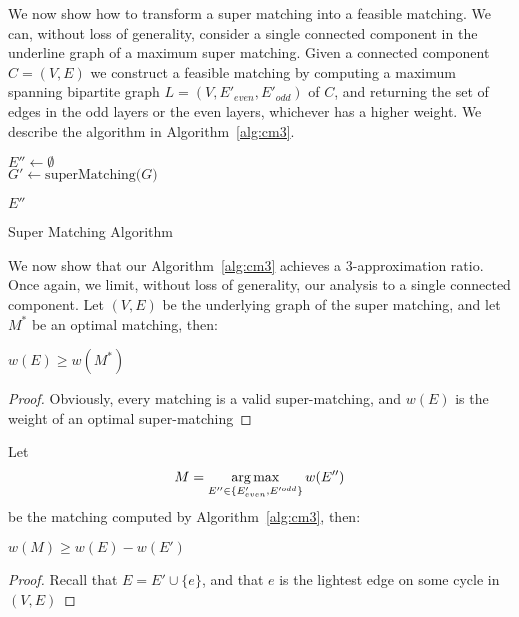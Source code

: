 We now show how to transform a super matching into a feasible matching.
We can, without loss of generality, 
consider a single connected component in the underline graph of a maximum super matching.
Given a connected component $C = (V, E)$ we construct a feasible matching by
computing a maximum spanning bipartite graph $L = (V, E'_{even}, E'_{odd})$ of $C$,
and returning the set of edges in the odd layers or the even layers,
whichever has a higher weight. 
We describe the algorithm in Algorithm~\ref{alg:cm3}.

\begin{algorithm}
\label{alg:cm3}

$E'' \leftarrow \emptyset$								\\
$G' \leftarrow \text{superMatching($G$)}$				\\


\Return $E''$
\caption{Super Matching Algorithm}
\end{algorithm}

We now show that our Algorithm~\ref{alg:cm3} achieves a 3-approximation ratio.
Once again, we limit, without loss of generality, 
our analysis to a single connected component.
Let $(V, E)$ be the underlying graph of the super matching, 
and let $M^*$ be an optimal matching, then:
\begin{lemma}
\label{lm:super-geq-m^*}
$w(E) \geq w(M^*)$
\end{lemma}

\begin{proof}
Obviously, every matching is a valid super-matching, 
and $w(E)$ is the weight of an optimal super-matching 
\end{proof}

Let
$$ M = \operatorname*{arg\,max}_{E'' \in \{ E'_{even}, E'^{odd} \}}{w(E'')} $$
be the matching computed by Algorithm~\ref{alg:cm3}, then:

\begin{lemma}
\label{lm:more_than_e}
$w(M) \geq w(E) - w(E')$
\end{lemma}

\begin{proof}
Recall that $E = E' \cup \{e\}$, and that $e$ is the lightest edge on some cycle in $(V, E)$ 
\end{proof}

